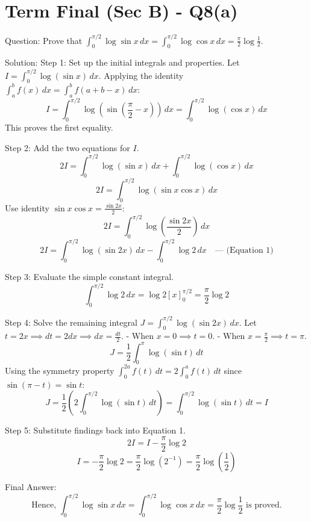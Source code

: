 \documentclass{article}
\begin{document}
\section*{Term Final (Sec B) - Q8(a)}
Question:
Prove that $\int_0^{\pi/2} \log \sin x \, dx = \int_0^{\pi/2} \log \cos x \, dx = \frac{\pi}{2} \log \frac{1}{2}$.

Solution:
Step 1: Set up the initial integrals and properties.
Let $I = \int_0^{\pi/2} \log(\sin x) \, dx$.
Applying the identity $\int_a^b f(x) \, dx = \int_a^b f(a+b-x) \, dx$:
\[
I = \int_0^{\pi/2} \log\left(\sin\left(\frac{\pi}{2} - x\right)\right) \, dx = \int_0^{\pi/2} \log(\cos x) \, dx
\]
This proves the first equality.

Step 2: Add the two equations for $I$.
\[
2I = \int_0^{\pi/2} \log(\sin x) \, dx + \int_0^{\pi/2} \log(\cos x) \, dx
\]
\[
2I = \int_0^{\pi/2} \log(\sin x \cos x) \, dx
\]
Use identity $\sin x \cos x = \frac{\sin 2x}{2}$:
\[
2I = \int_0^{\pi/2} \log\left(\frac{\sin 2x}{2}\right) \, dx
\]
\[
2I = \int_0^{\pi/2} \log(\sin 2x) \, dx - \int_0^{\pi/2} \log 2 \, dx \quad \text{--- (Equation 1)}
\]

Step 3: Evaluate the simple constant integral.
\[
\int_0^{\pi/2} \log 2 \, dx = \log 2 [x]_0^{\pi/2} = \frac{\pi}{2} \log 2
\]

Step 4: Solve the remaining integral $J = \int_0^{\pi/2} \log(\sin 2x) \, dx$.
Let $t = 2x \implies dt = 2dx \implies dx = \frac{dt}{2}$.
- When $x = 0 \implies t = 0$.
- When $x = \frac{\pi}{2} \implies t = \pi$.
\[
J = \frac{1}{2} \int_0^{\pi} \log(\sin t) \, dt
\]
Using the symmetry property $\int_0^{2a} f(t) \, dt = 2\int_0^a f(t) \, dt$ since $\sin(\pi - t) = \sin t$:
\[
J = \frac{1}{2} \left( 2 \int_0^{\pi/2} \log(\sin t) \, dt \right) = \int_0^{\pi/2} \log(\sin t) \, dt = I
\]

Step 5: Substitute findings back into Equation 1.
\[
2I = I - \frac{\pi}{2} \log 2
\]
\[
I = -\frac{\pi}{2} \log 2 = \frac{\pi}{2} \log\left(2^{-1}\right) = \frac{\pi}{2} \log\left(\frac{1}{2}\right)
\]

Final Answer:
\[
\text{Hence, } \int_0^{\pi/2} \log \sin x \, dx = \int_0^{\pi/2} \log \cos x \, dx = \frac{\pi}{2} \log \frac{1}{2} \text{ is proved.}
\]
\end{document}
